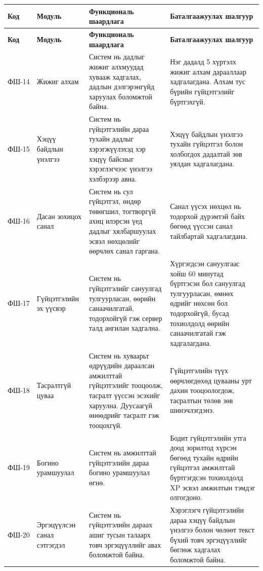 {\footnotesize
\setlength{\tabcolsep}{3pt}
\label{app:functional-2}
\begin{longtable}{|L{1.3cm}|L{2.5cm}|L{5.4cm}|L{4.0cm}|}
\hline
\textbf{Код} & \textbf{Модуль} & \textbf{Функциональ шаардлага} & \textbf{Баталгаажуулах шалгуур} \\
\hline
\endfirsthead
\hline
\textbf{Код} & \textbf{Модуль} & \textbf{Функциональ шаардлага} & \textbf{Баталгаажуулах шалгуур} \\
\hline
\endhead
ФШ-14 & Жижиг алхам & Систем нь дадлыг жижиг алхмуудад хувааж хадгалах, дадлын дэлгэрэнгүйд харуулах боломжтой байна. & Нэг дадалд 5 хүртэлх жижиг алхам дарааллаар хадгалагдана. Алхам тус бүрийн гүйцэтгэлийг бүртгэхгүй. \\
\hline
ФШ-15 & Хэцүү байдлын үнэлгээ & Систем нь гүйцэтгэлийн дараа тухайн дадлыг хэрэгжүүлэхэд хэр хэцүү байсныг хэрэглэгчээс үнэлгээ хэлбэрээр авна. & Хэцүү байдлын үнэлгээ тухайн гүйцэтгэл болон холбогдох дадалтай зөв уялдан хадгалагдана. \\
\hline
ФШ-16 & Дасан зохицох санал & Систем нь сул гүйцэтгэл, өндөр төвөгшил, тогтворгүй ахиц илэрсэн үед дадлыг хялбаршуулах эсвэл нөхцөлийг өөрчлөх санал гаргана. & Санал үүсэх нөхцөл нь тодорхой дүрэмтэй байх бөгөөд үүссэн санал тайлбартай хадгалагдана. \\
\hline
ФШ-17 & Гүйцэтгэлийн эх үүсвэр & Систем нь гүйцэтгэлийг сануулгад тулгуурласан, өөрийн санаачилгатай, тодорхойгүй гэж сервер талд ангилан хадгална. & Хүргэгдсэн сануулгаас хойш 60 минутад бүртгэсэн бол сануулгад тулгуурласан, өмнөх өдрийг нөхсөн бол тодорхойгүй, бусад тохиолдолд өөрийн санаачилгатай гэж хадгалагдана. \\
\hline
ФШ-18 & Тасралтгүй цуваа & Систем нь хуваарьт өдрүүдийн дараалсан амжилттай гүйцэтгэлийг тооцоолж, тасралт үүссэн эсэхийг харуулна. Дуусаагүй өнөөдрийг тасралт гэж тооцохгүй. & Гүйцэтгэлийн түүх өөрчлөгдөхөд цувааны урт дахин тооцоологдож, тасралтын төлөв зөв шинэчлэгдэнэ. \\
\hline
ФШ-19 & Богино урамшуулал & Систем нь амжилттай гүйцэтгэлийн дараа богино урамшуулал өгнө. & Бодит гүйцэтгэлийн утга доод зорилтод хүрсэн бөгөөд тухайн өдрийн гүйцэтгэл амжилттай бүртгэгдсэн тохиолдолд XP эсвэл амжилтын тэмдэг олгогдоно. \\
\hline
ФШ-20 & Эргэцүүлсэн санал сэтгэгдэл & Систем нь гүйцэтгэлийн дараах ашиг тусын талаарх товч эргэцүүллийг авах боломжтой байна. & Хэрэглэгч гүйцэтгэлийн дараа хэцүү байдлын үнэлгээ болон чөлөөт текст бүхий товч эргэцүүллийг бөглөж хадгалах боломжтой байна. \\

\end{longtable}}
